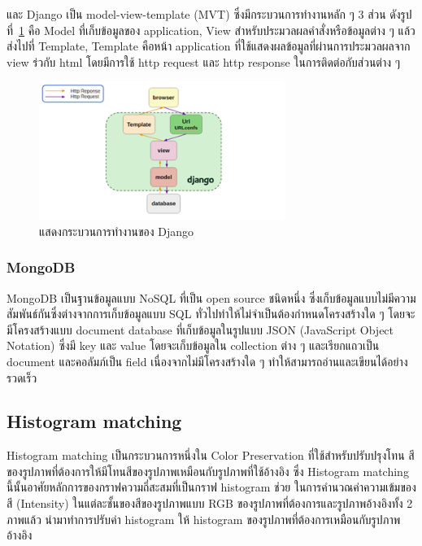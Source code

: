 \documentclass[12pt,oneside,openright,a4paper]{cpe-thai-project}
\begin{document}
\par\setlength{\parindent}{5ex}
และ Django เป็น model-view-template (MVT) ซึ่งมีกระบวนการทำงานหลัก ๆ 3 ส่วน ดังรูปที่~\ref{fig:django2} คือ Model ที่เก็บข้อมูลของ application, View สำหรับประมวลผลคำสั่งหรือข้อมูลต่าง ๆ แล้วส่งไปที่ Template, Template คือหน้า application ที่ใช้แสดงผลข้อมูลที่ผ่านการประมวลผลจาก view ร่วกับ html โดยมีการใช้ http request และ http response ในการติดต่อกับส่วนต่าง ๆ 

\begin{figure}[!h]
  \centering
  \includegraphics[width=8cm]{./image/django2.png}
  \caption{แสดงกระบวนการทำงานของ Django}
  \label{fig:django2}
\end{figure}


\subsubsection{MongoDB}
\par\setlength{\parindent}{5ex}
MongoDB เป็นฐานข้อมูลแบบ NoSQL ที่เป็น open source ชนิดหนึ่ง ซึ่งเก็บข้อมูลแบบไม่มีความสัมพันธ์กันซึ่งต่างจากการเก็บข้อมูลแบบ SQL ทั่วไปทำให้ไม่จำเป็นต้องกำหนดโครงสร้างใด ๆ โดยจะมีโครงสร้างแบบ document database ที่เก็บข้อมูลในรูปแบบ JSON (JavaScript Object Notation) ซึ่งมี key และ value โดยจะเก็บข้อมูลใน collection ต่าง ๆ และเรียกแถวเป็น document และคอลัมภ์เป็น field เนื่องจากไม่มีโครงสร้างใด ๆ ทำให้สามารถอ่านและเขียนได้อย่างรวดเร็ว


\subsection{Histogram matching}
Histogram matching เป็นกระบวนการหนึ่งใน Color Preservation ที่ใช้สำหรับปรับปรุงโทน
สีของรูปภาพที่ต้องการให้มีโทนสีของรูปภาพเหมือนกับรูปภาพที่ใช้อ้างอิง ซึ่ง Histogram matching นี้นั้นอาศัยหลักการของกราฟความถี่สะสมที่เป็นกราฟ histogram ช่วย
ในการคำนวณค่าความเข้มของสี (Intensity) ในแต่ละชั้นของสีของรูปภาพแบบ RGB ของรูปภาพที่ต้องการและรูปภาพอ้างอิงทั้ง 2 ภาพแล้ว
นำมาทำการปรับค่า histogram ให้ histogram ของรูปภาพที่ต้องการเหมือนกับรูปภาพอ้างอิง
\end{document}
